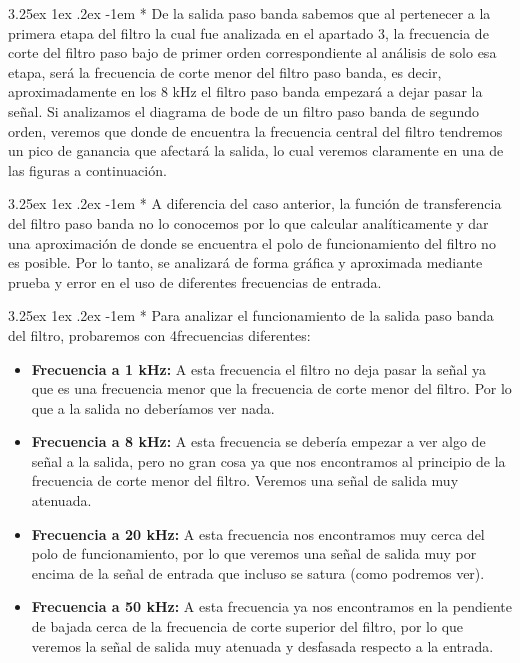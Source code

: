 \documentclass[12pt]{article}
\makeatletter
\renewcommand\paragraph{\@startsection{paragraph}{5}{\z@}%
  {3.25ex \@plus1ex \@minus.2ex}%
  {-1em}%
  {\normalfont\normalsize\bfseries}}
\makeatother
\begin{document}
    \paragraph*{}
    De la salida paso banda sabemos que al pertenecer a la primera etapa del filtro la cual fue analizada en el apartado 3, la frecuencia de corte 
    del filtro paso bajo de primer orden correspondiente al análisis de solo esa etapa, será la frecuencia de corte menor del filtro paso banda, es decir, 
    aproximadamente en los 8 kHz el filtro paso banda empezará a dejar pasar la señal. Si analizamos el diagrama de bode de un filtro paso banda de segundo orden, 
    veremos que donde de encuentra la frecuencia central del filtro tendremos un pico de ganancia que afectará la salida, lo cual veremos claramente en una de las 
    figuras a continuación. 

    \paragraph*{}
    A diferencia del caso anterior, la función de transferencia del filtro paso banda no lo conocemos por lo que calcular analíticamente y dar una aproximación de 
    donde se encuentra el polo de funcionamiento del filtro no es posible. Por lo tanto, se analizará de forma gráfica y aproximada mediante prueba y error en el uso 
    de diferentes frecuencias de entrada. 

    \paragraph*{}
    Para analizar el funcionamiento de la salida paso banda del filtro, probaremos con 4frecuencias diferentes: 

    \begin{itemize}
      \item \textbf{Frecuencia a 1 kHz:} A esta frecuencia el filtro no deja pasar la señal ya que es una frecuencia menor que la frecuencia de corte menor del filtro. Por 
      lo que a la salida no deberíamos ver nada. 
      \item \textbf{Frecuencia a 8 kHz:} A esta frecuencia se debería empezar a ver algo de señal a la salida, pero no gran cosa ya que nos encontramos al principio de la 
      frecuencia de corte menor del filtro. Veremos una señal de salida muy atenuada. 
      \item \textbf{Frecuencia a 20 kHz:} A esta frecuencia nos encontramos muy cerca del polo de funcionamiento, por lo que veremos una señal de salida muy por encima de la señal 
      de entrada que incluso se satura (como podremos ver).
      \item \textbf{Frecuencia a 50 kHz:} A esta frecuencia ya nos encontramos en la pendiente de bajada cerca de la frecuencia de corte superior del filtro, por lo que veremos la 
      señal de salida muy atenuada y desfasada respecto a la entrada. 
    \end{itemize}
\end{document}
